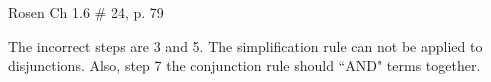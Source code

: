 \begin{questions}
 Rosen Ch 1.6 \# 24, p. 79
    \ifprintanswers
        \vspace{-10pt}
    \fi
\begin{solution}
    The incorrect steps are 3 and 5.  The simplification rule can not be applied to disjunctions.  Also, step 7 the conjunction rule should ``AND" terms together.
\end{solution}








\end{questions}
